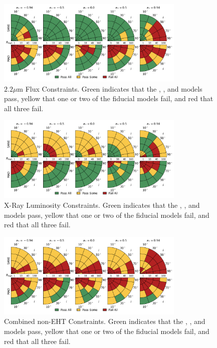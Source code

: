 \begin{figure}
  \centering
  \includegraphics[width=0.8\textwidth]{./figures/2um_flux_Constraints.png}
  \caption{$2.2\mu$m Flux Constraints.  Green indicates that the \kharma, \bhac, and \hamr models pass, yellow that one or two of the fiducial models fail, and red that all three fail.}
  \label{fig:2um_flux_pizza}
\end{figure}

\begin{figure}
  \centering
  \includegraphics[width=0.8\textwidth]{./figures/Xray_flux_Constraints.png}
  \caption{X-Ray Luminosity Constraints.  Green indicates that the \kharma, \bhac, and \hamr models pass, yellow that one or two of the fiducial models fail, and red that all three fail.}
  \label{fig:xray_pizza}
\end{figure}

\begin{figure}
  \centering
  \includegraphics[width=0.8\textwidth]{./figures/Non_Interferometric_Constraints.png}
  \caption{Combined non-EHT Constraints.  Green indicates that the \kharma, \bhac, and \hamr models pass, yellow that one or two of the fiducial models fail, and red that all three fail.}
  \label{fig:noneht_pizza}
\end{figure}

